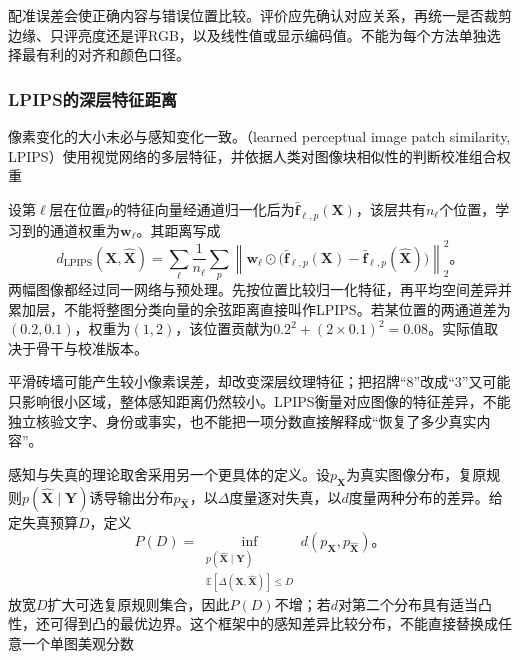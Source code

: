 配准误差会使正确内容与错误位置比较。评价应先确认对应关系，再统一是否裁剪边缘、只评亮度还是评RGB，以及线性值或显示编码值。不能为每个方法单独选择最有利的对齐和颜色口径。

\Needspace{65mm}
\subsubsection{LPIPS的深层特征距离}
\label{sec:vision-restoration-lpips}

像素变化的大小未必与感知变化一致。（learned perceptual image patch similarity, LPIPS）使用视觉网络的多层特征，并依据人类对图像块相似性的判断校准组合权重

设第$\ell$层在位置$p$的特征向量经通道归一化后为$\bar{\bm{f}}_{\ell,p}(\bm{X})$，该层共有$n_\ell$个位置，学习到的通道权重为$\bm{w}_\ell$。其距离写成
\begin{equation}
 d_{\mathrm{LPIPS}}(\bm{X},\widehat{\bm{X}})
 =
 \sum_\ell\frac1{n_\ell}\sum_p
 \left\lVert
 \bm{w}_\ell\odot
 \bigl(\bar{\bm{f}}_{\ell,p}(\bm{X})
      -\bar{\bm{f}}_{\ell,p}(\widehat{\bm{X}})\bigr)
 \right\rVert_2^2\text{。}
 \label{eq:vision-lpips}
\end{equation}
两幅图像都经过同一网络与预处理。先按位置比较归一化特征，再平均空间差异并累加层，不能将整图分类向量的余弦距离直接叫作LPIPS。若某位置的两通道差为$(0.2,0.1)$，权重为$(1,2)$，该位置贡献为$0.2^2+(2\times0.1)^2=0.08$。实际值取决于骨干与校准版本。

平滑砖墙可能产生较小像素误差，却改变深层纹理特征；把招牌“8”改成“3”又可能只影响很小区域，整体感知距离仍然较小。LPIPS衡量对应图像的特征差异，不能独立核验文字、身份或事实，也不能把一项分数直接解释成“恢复了多少真实内容”。

感知与失真的理论取舍采用另一个更具体的定义。设$p_{\bm{X}}$为真实图像分布，复原规则$p(\widehat{\bm{X}}\mid\bm{Y})$诱导输出分布$p_{\widehat{\bm{X}}}$，以$\Delta$度量逐对失真，以$d$度量两种分布的差异。给定失真预算$D$，定义
\begin{equation}
 P(D)=
 \inf_{\substack{p(\widehat{\bm{X}}\mid\bm{Y})\\
  \mathbb{E}[\Delta(\bm{X},\widehat{\bm{X}})]\leq D}}
 d(p_{\bm{X}},p_{\widehat{\bm{X}}})\text{。}
 \label{eq:vision-perception-distortion}
\end{equation}
放宽$D$扩大可选复原规则集合，因此$P(D)$不增；若$d$对第二个分布具有适当凸性，还可得到凸的最优边界。这个框架中的感知差异比较分布，不能直接替换成任意一个单图美观分数

